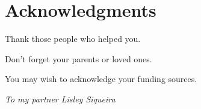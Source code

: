 
\chapter{Acknowledgments}

Thank those people who helped you. 

Don't forget your parents or loved ones.

You may wish to acknowledge your funding sources.



\clearpage

\thispagestyle{empty}
\vspace*{\fill}
\begin{flushright}
\emph{To my partner Lisley Siqueira}
\end{flushright}
\vspace*{\fill}




\clearpage